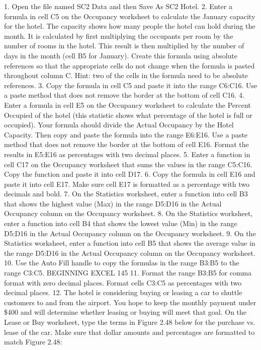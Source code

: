 1. Open the file named SC2 Data and then Save As SC2 Hotel.
2. Enter a formula in cell C5 on the Occupancy worksheet to calculate the January capacity for
the hotel. The capacity shows how many people the hotel can hold during the month. It is
calculated by first multiplying the occupants per room by the number of rooms in the hotel.
This result is then multiplied by the number of days in the month (cell B5 for January). Create
this formula using absolute references so that the appropriate cells do not change when the
formula is pasted throughout column C. Hint: two of the cells in the formula need to be absolute
references.
3. Copy the formula in cell C5 and paste it into the range C6:C16. Use a paste method that does
not remove the border at the bottom of cell C16.
4. Enter a formula in cell E5 on the Occupancy worksheet to calculate the Percent Occupied of
the hotel (this statistic shows what percentage of the hotel is full or occupied). Your formula
should divide the Actual Occupancy by the Hotel Capacity. Then copy and paste the formula
into the range E6:E16. Use a paste method that does not remove the border at the bottom of cell
E16. Format the results in E5:E16 as percentages with two decimal places.
5. Enter a function in cell C17 on the Occupancy worksheet that sums the values in the range
C5:C16. Copy the function and paste it into cell D17.
6. Copy the formula in cell E16 and paste it into cell E17. Make sure cell E17 is formatted as a
percentage with two decimals and bold.
7. On the Statistics worksheet, enter a function into cell B3 that shows the highest value (Max) in
the range D5:D16 in the Actual Occupancy column on the Occupancy worksheet.
8. On the Statistics worksheet, enter a function into cell B4 that shows the lowest value (Min) in
the range D5:D16 in the Actual Occupancy column on the Occupancy worksheet.
9. On the Statistics worksheet, enter a function into cell B5 that shows the average value in the
range D5:D16 in the Actual Occupancy column on the Occupancy worksheet.
10. Use the Auto Fill handle to copy the formulas in the range B3:B5 to the range C3:C5.
BEGINNING EXCEL 145
11. Format the range B3:B5 for comma format with zero decimal places. Format cells C3:C5 as
percentages with two decimal places.
12. The hotel is considering buying or leasing a car to shuttle customers to and from the airport.
You hope to keep the monthly payment under \$400 and will determine whether leasing or
buying will meet that goal. On the Lease or Buy worksheet, type the terms in Figure 2.48 below
for the purchase vs. lease of the car. Make sure that dollar amounts and percentages are
formatted to match Figure 2.48:




